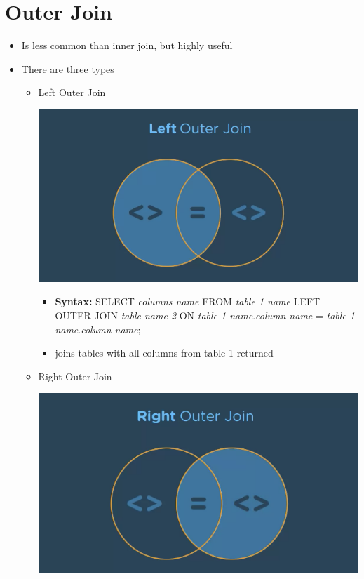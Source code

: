 \documentclass[12pt]{article}
\begin{document}
\bigskip

\section{Outer Join}

\bigskip

\begin{itemize}
    \item Is less common than inner join, but highly useful
    \item There are three types
    \begin{itemize}
        \item Left Outer Join
        \begin{center}
        \includegraphics[width=0.6\linewidth]{images/part_4_notes_5.png}
        \end{center}

        \begin{itemize}
            \item \textbf{Syntax:} SELECT \textit{columns name} FROM \textit{table 1 name}
            LEFT OUTER JOIN \textit{table name 2} ON \textit{table 1 name}.\textit{column name} = \textit{table 1 name}.\textit{column name};
            \item joins tables with all columns from table 1 returned
        \end{itemize}

        \bigskip

        \item Right Outer Join

        \begin{center}
        \includegraphics[width=0.6\linewidth]{images/part_4_notes_6.png}
        \end{center}


\end{itemize}
\end{itemize}
\end{document}

